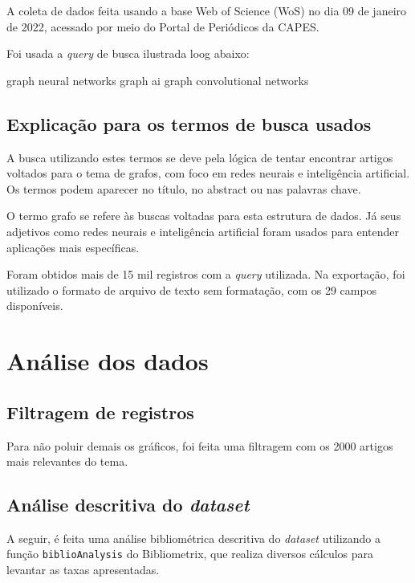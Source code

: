A coleta de dados feita usando a base Web of Science (WoS) no dia 09 de janeiro de 2022, acessado por meio do Portal de Periódicos da CAPES.

Foi usada a \textit{query} de busca ilustrada loog abaixo:

graph neural networks
graph ai
graph convolutional networks

\subsection{Explicação para os termos de busca usados\label{sec:tucazorron:query}}

A busca utilizando estes termos se deve pela lógica de tentar encontrar artigos voltados para o tema de grafos, com foco em redes neurais e inteligência artificial. Os termos podem aparecer no título, no abstract ou nas palavras chave.

O termo grafo se refere às buscas voltadas para esta estrutura de dados. Já seus adjetivos como redes neurais e inteligência artificial foram usados para entender aplicações mais específicas.

Foram obtidos mais de 15 mil registros com a \textit{query} utilizada. Na exportação, foi utilizado o formato de arquivo de texto sem formatação, com os 29 campos disponíveis.

\section{Análise dos dados}

\subsection{Filtragem de registros}

Para não poluir demais os gráficos, foi feita uma filtragem com os 2000 artigos mais relevantes do tema.

\subsection{Análise descritiva do \textit{dataset} }

A seguir, é feita uma análise bibliométrica descritiva do \textit{dataset} utilizando a função \texttt{biblioAnalysis} do Bibliometrix, que realiza diversos cálculos para levantar as taxas apresentadas.

